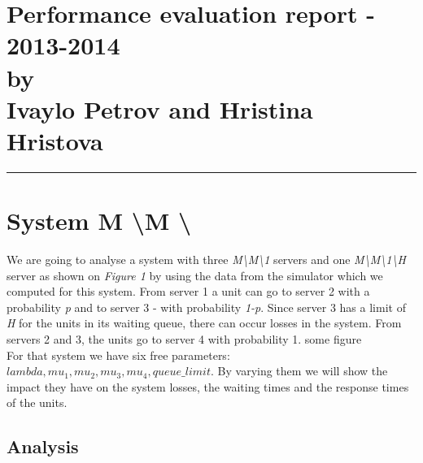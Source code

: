 \documentclass[12pt]{article}
\newcommand{\hr}{\rule{\linewidth}{0.1mm}}
\theoremstyle{plain}
\begin{document}
\section*{\centering
  Performance evaluation report - 2013-2014 \\
  by\\
  Ivaylo Petrov and Hristina Hristova 
}

\hr
\section{\textbf{System M \textbackslash M \textbackslash *}}

We are going to analyse a system with three \emph{M\textbackslash M\textbackslash 1}
servers and one \emph{M\textbackslash M\textbackslash 1\textbackslash H} server
as shown on \emph{Figure 1} by using the data from the simulator which we computed
for this system. From server 1 a unit can go to server 2 with a probability
\emph{p} and to server 3 - with probability \emph{1-p}. Since server 3 has a
limit of \emph{H} for the units in its waiting queue, there can occur losses
in the system. From servers 2 and 3, the units go to server 4 with probability 1.
some figure \\
For that system we have six free parameters: $lambda, mu_1, mu_2, mu_3, mu_4,
queue\_limit$. By varying them we will show the impact they have on the system
losses, the waiting times and the response times of the units.

\subsection*{Analysis}
\end{document}
